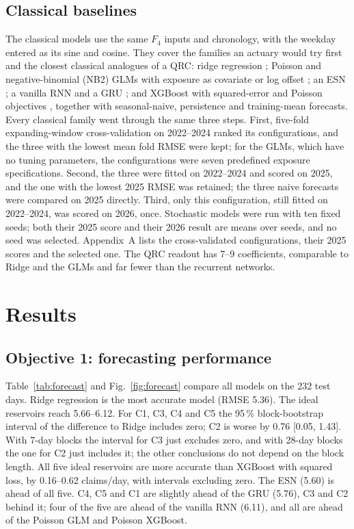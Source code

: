 \documentclass[journal]{IEEEtran}
\begin{document}
\subsection{Classical baselines}
The classical models use the same $F_4$ inputs and chronology, with the weekday entered as its sine and cosine. They cover the families an actuary would try first and the closest classical analogues of a QRC: ridge regression \cite{Hoerl1970Ridge}; Poisson and negative-binomial (NB2) GLMs with exposure as covariate or log offset \cite{Nelder1972GLM,Cameron2013Count}; an ESN \cite{Jaeger2004ESN}; a vanilla RNN and a GRU \cite{Elman1990RNN,Cho2014GRU}; and XGBoost with squared-error and Poisson objectives \cite{Chen2016XGBoost}, together with seasonal-naive, persistence and training-mean forecasts. Every classical family went through the same three steps. First, five-fold expanding-window cross-validation on 2022--2024 ranked its configurations, and the three with the lowest mean fold RMSE were kept; for the GLMs, which have no tuning parameters, the configurations were seven predefined exposure specifications. Second, the three were fitted on 2022--2024 and scored on 2025, and the one with the lowest 2025 RMSE was retained; the three naive forecasts were compared on 2025 directly. Third, only this configuration, still fitted on 2022--2024, was scored on 2026, once. Stochastic models were run with ten fixed seeds; both their 2025 score and their 2026 result are means over seeds, and no seed was selected. Appendix~A lists the cross-validated configurations, their 2025 scores and the selected one. The QRC readout has 7--9 coefficients, comparable to Ridge and the GLMs and far fewer than the recurrent networks.

\section{Results}
\subsection{Objective 1: forecasting performance}
Table~\ref{tab:forecast} and Fig.~\ref{fig:forecast} compare all models on the 232 test days. Ridge regression is the most accurate model (RMSE 5.36). The ideal reservoirs reach 5.66--6.12. For C1, C3, C4 and C5 the 95\,\% block-bootstrap interval of the difference to Ridge includes zero; C2 is worse by 0.76 [0.05, 1.43]. With 7-day blocks the interval for C3 just excludes zero, and with 28-day blocks the one for C2 just includes it; the other conclusions do not depend on the block length. All five ideal reservoirs are more accurate than XGBoost with squared loss, by 0.16--0.62 claims/day, with intervals excluding zero. The ESN (5.60) is ahead of all five. C4, C5 and C1 are slightly ahead of the GRU (5.76), C3 and C2 behind it; four of the five are ahead of the vanilla RNN (6.11), and all are ahead of the Poisson GLM and Poisson XGBoost.
\end{document}
